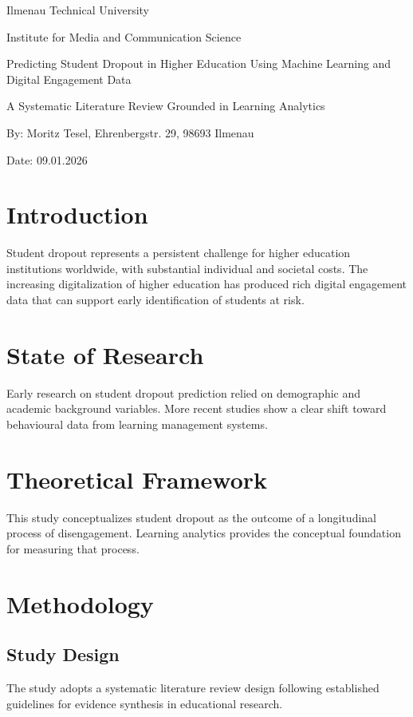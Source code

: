 \documentclass[12pt]{article}
\begin{document}
Ilmenau Technical University

Institute for Media and Communication Science

Predicting Student Dropout in Higher Education Using Machine Learning and Digital Engagement Data

A Systematic Literature Review Grounded in Learning Analytics

By: Moritz Tesel, Ehrenbergstr. 29, 98693 Ilmenau

Date: 09.01.2026


\tableofcontents

\newpage

\section{Introduction}

Student dropout represents a persistent challenge for higher education institutions worldwide, with substantial individual and societal costs. The increasing digitalization of higher education has produced rich digital engagement data that can support early identification of students at risk.

\section{State of Research}

Early research on student dropout prediction relied on demographic and academic background variables. More recent studies show a clear shift toward behavioural data from learning management systems.

\section{Theoretical Framework}

This study conceptualizes student dropout as the outcome of a longitudinal process of disengagement. Learning analytics provides the conceptual foundation for measuring that process.

\section{Methodology}

\subsection{Study Design}

The study adopts a systematic literature review design following established guidelines for evidence synthesis in educational research.
\end{document}
